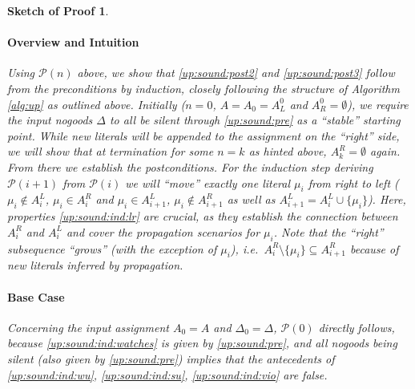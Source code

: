 \documentclass{vutinfth} %
\newtheorem{proof-sketch}{Sketch of Proof}[chapter]
\newcommand{\ass}{A}
\newcommand{\welf}{well formed\xspace}
\newcommand{\sgl}{\mu}
\begin{document}
\begin{proof-sketch}
\paragraph{Overview and Intuition} Using $\mathcal{P}(n)$ above, we show that \ref{up:sound:post2} and \ref{up:sound:post3} follow from the preconditions by induction, closely following the structure of Algorithm \ref{alg:up} as outlined above. Initially ($n = 0$, $\ass = \ass_0 = \ass_L^0$ and $\ass_R^0 = \emptyset$), we require the input nogoods $\Delta$ to all be silent through \ref{up:sound:pre} as a \enquote{stable} starting point. While new literals will be appended to the assignment on the \enquote{right} side, we will show that at termination for some $n = k$ as hinted above, $\ass_k^R = \emptyset$ again. From there we establish the postconditions. For the induction step deriving $\mathcal{P}(i + 1)$ from $\mathcal{P}(i)$ we will \enquote{move} exactly one literal $\sgl_i$ from right to left ($\sgl_i \not \in \ass_i^L$, $\sgl_i \in \ass_i^R$ and $\sgl_i \in \ass_{i+1}^L$, $\sgl_i \not \in \ass_{i+1}^R$ as well as $\ass_{i+1}^L = \ass_{i}^L \cup \{ \sgl_i \}$). Here, properties \ref{up:sound:ind:lr} are crucial, as they establish the connection between $A_i^R$ and $A_i^L$ and cover the propagation scenarios for $\sgl_i$. Note that the \enquote{right} subsequence \enquote{grows} (with the exception of $\sgl_i$), i.e.~$\ass_{i}^R \setminus \{ \sgl_i \} \subseteq \ass_{i+1}^R$ because of new literals inferred by propagation.

\paragraph{Base Case} Concerning the input assignment $\ass_0 = \ass$ and $\Delta_0 = \Delta$, $\mathcal{P}(0)$ directly follows, because \ref{up:sound:ind:watches} is given by \ref{up:sound:pre}, and all nogoods being silent (also given by \ref{up:sound:pre}) implies that the antecedents of \ref{up:sound:ind:wu}, \ref{up:sound:ind:su}, \ref{up:sound:ind:vio} are false.




\end{proof-sketch}
\end{document}

